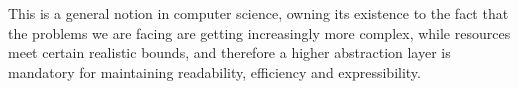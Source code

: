 \documentclass[sigplan,review,anonymous,screen]{acmart}
\begin{document}
This is a general notion in computer science, owning its existence to the fact
that the problems we are facing are getting increasingly more complex, while
resources meet certain realistic bounds, and therefore a higher abstraction
layer is mandatory for maintaining readability, efficiency and expressibility.


\end{document}
